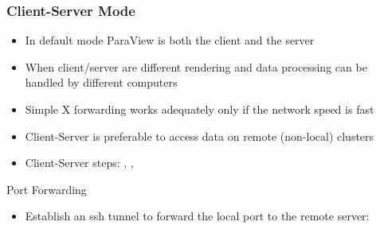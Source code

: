 \begin{frame}
  \frametitle{Client-Server Mode}

    \begin{itemize}
      \item In default mode ParaView is both the client and the server
      \item When client/server are different rendering and data processing can
        be handled by different computers 
      \item Simple X forwarding works adequately only if the network speed is fast
      \item Client-Server is preferable to access data on remote (non-local) clusters 
      \item Client-Server steps: , ,   
    \end{itemize}

    \begin{block}{Port Forwarding}
        \begin{itemize}
          \item Establish an ssh tunnel to forward the local port to the remote server: \\  
        \end{itemize}
    \end{block}

\end{frame}


